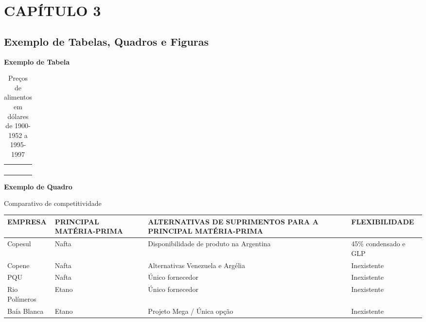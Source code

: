 \chapter{CAPÍTULO 3}
\section{Exemplo de Tabelas, Quadros e Figuras}

{\centering\bfseries\color{red}
Exemplo de Tabela
\par}

\begin{table}[ht]
\centering
\caption{Preços de alimentos em dólares de 1900-1952 a
1995-1997}
\begin{supertabular}{m{3.6cm}m{3.7cm}m{3.6cm}m{3.0cm}}
\hline
{} &
 &
 &
\centering{}\\\hline
{} &
 &
 &
\centering{}\\
 &
 &
 &
\centering{}\\
 &
 &
 &
\centering{}\\
 &
 &
 &
\centering{}\\\hline
\end{supertabular}
    \label{tab:alimentos}
\end{table}

\bigskip

{\centering\bfseries\color{red}
Exemplo de Quadro
\par}

\begin{quadro}[htb]
\centering
\caption{Comparativo de competitividade}
\begin{supertabular}{|m{2.5cm}|m{2.5cm}|m{6.0cm}|m{3.2cm}|}
\hline
{ EMPRESA } &
{ PRINCIPAL MATÉRIA-PRIMA } &
{ ALTERNATIVAS DE SUPRIMENTOS PARA A PRINCIPAL MATÉRIA-PRIMA } &
{ FLEXIBILIDADE }\\\hline
{ Copesul } &
{ Nafta } &
{ Disponibilidade de produto na Argentina} &
{ 45\% condensado e GLP }\\\hline
{ Copene } &
{ Nafta } &
{ Alternativas Venezuela e Argélia } &
{ Inexistente }\\\hline
{ PQU } &
{ Nafta } &
{ Único fornecedor } &
{ Inexistente }\\\hline
{ Rio Polímeros } &
{ Etano } &
{ Único fornecedor } &
{ Inexistente }\\\hline
{ Baía Blanca } &
{ Etano } &
{ Projeto Mega / Única opção } &
{ Inexistente }\\\hline
\end{supertabular}
    \label{quad:quadro1}
\end{quadro}

